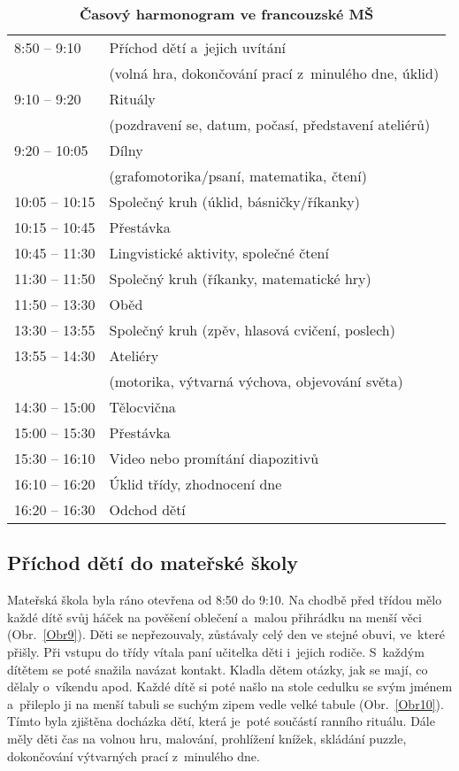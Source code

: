 \begin{spacing}{1.0}
	\begin{table}[h!]
		\center
		\begin{tabular}{|l l|}
			\hline
			\rowcolor{grey!0}
			8:50 – 9:10 		& Příchod dětí a~jejich uvítání 						\\
								& (volná hra, dokončování prací z minulého dne, úklid) 	\\
			9:10 – 9:20			& Rituály 												\\
								& (pozdravení se, datum, počasí, představení ateliérů) 	\\
			9:20 – 10:05		& Dílny 												\\
								& (grafomotorika/psaní, matematika, čtení) 				\\
			10:05 – 10:15		& Společný kruh (úklid, básničky/říkanky) 				\\
			10:15 – 10:45		& Přestávka 											\\
			10:45 – 11:30		& Lingvistické aktivity, společné čtení 				\\
			11:30 – 11:50		& Společný kruh (říkanky, matematické hry) 				\\
			11:50 – 13:30		& Oběd 													\\
			13:30 – 13:55		& Společný kruh (zpěv, hlasová cvičení, poslech) 		\\
			13:55 – 14:30		& Ateliéry 												\\
								&(motorika, výtvarná výchova, objevování světa) 		\\
			14:30 – 15:00		& Tělocvična 											\\
			15:00 – 15:30		& Přestávka 											\\
			15:30 – 16:10		& Video nebo promítání diapozitivů 						\\
			16:10 – 16:20		& Úklid třídy, zhodnocení dne 							\\
			16:20 – 16:30		& Odchod dětí 											\\
			\hline
		\end{tabular}
		\caption{ \textbf{Časový harmonogram ve francouzské MŠ}	
		}
		\label{tab:rezimDneFR}
	\end{table}
	\end{spacing}

		\subsection{Příchod dětí do mateřské školy}
		\label{prichod}
			Mateřská škola byla ráno otevřena od 8:50 do 9:10. Na chodbě před třídou mělo každé dítě svůj háček na pověšení oblečení a~malou přihrádku na menší věci (Obr.~\ref{Obr9}). Děti se nepřezouvaly, zůstávaly celý den ve stejné obuvi, ve které přišly. Při vstupu do třídy vítala paní učitelka děti i~jejich rodiče. S každým dítětem se poté snažila navázat kontakt. Kladla dětem otázky, jak se mají, co dělaly o~víkendu apod. Každé dítě si poté našlo na stole cedulku se svým jménem a~přileplo ji na menší tabuli se suchým zipem vedle velké tabule (Obr.~\ref{Obr10}). Tímto byla zjištěna docházka dětí, která je poté součástí ranního rituálu. Dále měly děti čas na volnou hru, malování, prohlížení knížek, skládání puzzle, dokončování výtvarných prací z minulého dne.
		
